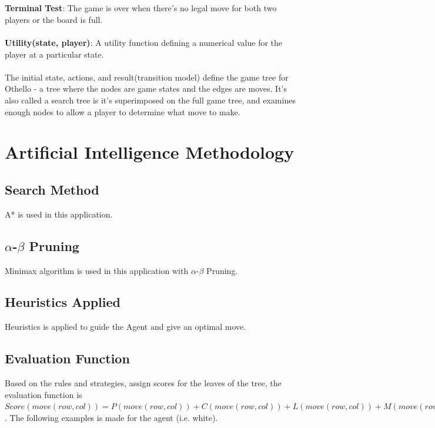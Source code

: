 \documentclass[letterpaper,12pt]{article}
\begin{document}
\\\\
\textbf{Terminal Test}: The game is over when there's no legal move for both two players or the board is full.
\\\\
\textbf{Utility(state, player)}: A utility function defining a numerical value for the player at a particular state.
\\\\
The initial state, actions, and result(transition model) define the game tree for Othello - a tree where the nodes are game states and the edges are moves. It's also called a search tree is it's superimposed on the full game tree, and examines enough nodes to allow a player to determine what move to make.


\section{Artificial Intelligence Methodology}
\subsection{Search Method}

A* is used in this application.

\subsection{$\alpha$-$\beta$ Pruning}

Minimax algorithm is used in this application with $\alpha$-$\beta$ Pruning.

\subsection{Heuristics Applied}

Heuristics is applied to guide the Agent and give an optimal move.

\subsection{Evaluation Function}

Based on the rules and strategies, assign scores for the leaves of the tree, the evaluation function is $Score(move(row, col)) = P(move(row, col)) + C(move(row, col)) + L(move(row, col)) + M(move(row, col))$. The following examples is made for the agent (i.e. white).
\end{document}
